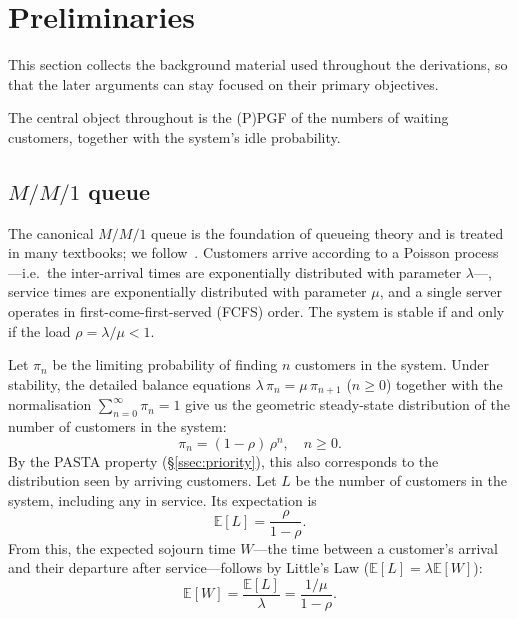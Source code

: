 \section{Preliminaries}\label{sec:prelim}

This section collects the background material used throughout the derivations, so that the later arguments can stay focused on their primary objectives.

The central object throughout is the (P)PGF of the numbers of waiting customers, together with the system's idle probability.


\subsection{\texorpdfstring{$M/M/1$}{M/M/1} queue}\label{ssec:mm1}

The canonical $M/M/1$ queue is the foundation of queueing theory and is treated in many textbooks; we follow~\cite{adan2002queueing}.
Customers arrive according to a Poisson process ---i.e.\ the inter-arrival times are exponentially distributed with parameter $\lambda$---, service times are exponentially distributed with parameter $\mu$, and a single server operates in first-come-first-served (FCFS) order. The system is stable if and only if the load $\rho = \lambda/\mu < 1$.

Let $\pi_n$ be the limiting probability of finding $n$ customers in the system. Under stability, the detailed balance equations $\lambda\,\pi_n = \mu\,\pi_{n+1}$ ($n \geq 0$) together with the normalisation $\sum_{n=0}^{\infty}\pi_n=1$ give us the geometric steady-state distribution of the number of customers in the system:
\begin{equation*}
    \pi_n = (1-\rho)\,\rho^n, \quad n \ge 0. 
\end{equation*}
By the PASTA property (\S\ref{ssec:priority}), this also corresponds to the distribution seen by arriving customers. Let $L$ be the number of customers in the system, including any in service. Its expectation is
\begin{equation*}
    \mathbb{E}[L] = \frac{\rho}{1-\rho}.
\end{equation*}
From this, the expected sojourn time $W$---the time between a customer's arrival and their departure after service---follows by Little's Law ($\mathbb{E}[L] = \lambda\mathbb{E}[W]$):
\begin{equation*}
    \mathbb{E}[W] = \frac{\mathbb{E}[L]}{\lambda} = \frac{1/\mu}{1-\rho}.
\end{equation*}

